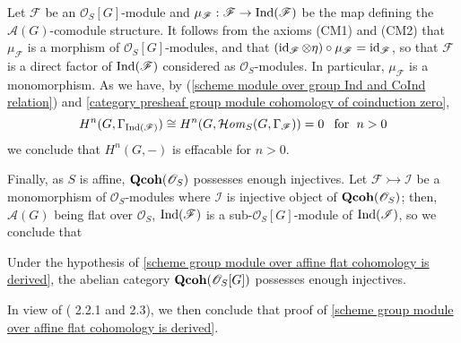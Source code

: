 Let $\mathscr{F}$ be an $\mathscr{O}_S[G]$-module and $\mu_\mathscr{F}:\mathscr{F}\to\mathrm{Ind}(\mathscr{F})$ be the map defining the $\mathscr{A}(G)$-comodule structure. It follows from the axioms (CM1) and (CM2) that $\mu_\mathscr{F}$ is a morphism of $\mathscr{O}_S[G]$-modules, and that $(\operatorname{id}_\mathscr{F}\otimes\eta)\circ\mu_\mathscr{F}=\operatorname{id}_\mathscr{F}$, so that $\mathscr{F}$ is a direct factor of $\mathrm{Ind}(\mathscr{F})$ considered as $\mathscr{O}_S$-modules. In particular, $\mu_\mathscr{F}$ is a monomorphism. As we have, by (\ref{scheme module over group Ind and CoInd relation}) and \cref{category presheaf group module cohomology of coinduction zero},
\[H^n(G,\Gamma_{\mathrm{Ind}(\mathscr{F})})\cong H^n(G,\operatorname{\mathcal{H}\hspace*{-0.4pt}\textit{om}\hspace{0.5pt}}_S(G,\Gamma_\mathscr{F}))=0\hspace{8pt}\text{for}\hspace{6pt} n>0\]
we conclude that $H^n(G,-)$ is effacable for $n>0$.\par
Finally, as $S$ is affine, $\mathbf{Qcoh}(\mathscr{O}_S)$ possesses enough injectives. Let $\mathscr{F}\rightarrowtail\mathscr{I}$ be a monomorphism of $\mathscr{O}_S$-modules where $\mathscr{I}$ is injective object of $\mathbf{Qcoh}(\mathscr{O}_S)$; then, $\mathscr{A}(G)$ being flat over $\mathscr{O}_S$, $\mathrm{Ind}(\mathscr{F})$ is a sub-$\mathscr{O}_S[G]$-module of $\mathrm{Ind}(\mathscr{I})$, so we conclude that
\begin{corollary}\label{scheme group module over affine Qcoh enough injective}
Under the hypothesis of \cref{scheme group module over affine flat cohomology is derived}, the abelian category $\mathbf{Qcoh}(\mathscr{O}_S[G])$ possesses enough injectives.
\end{corollary}

In view of (\cite{tohoku} 2.2.1 and 2.3), we then conclude that proof of \cref{scheme group module over affine flat cohomology is derived}.

